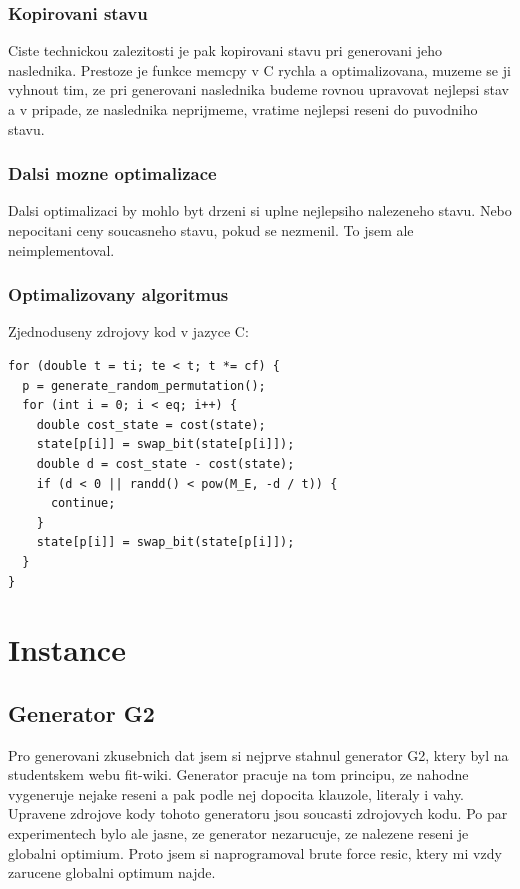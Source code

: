 \documentclass[12pt,a4paper]{article}
\begin{document}
\subsubsection{Kopirovani stavu}

Ciste technickou zalezitosti je pak kopirovani stavu pri generovani jeho naslednika. Prestoze je funkce memcpy v C rychla a optimalizovana, muzeme se ji vyhnout tim, ze pri generovani naslednika budeme rovnou upravovat nejlepsi stav a v pripade, ze naslednika neprijmeme, vratime nejlepsi reseni do puvodniho stavu.

\subsubsection{Dalsi mozne optimalizace}

Dalsi optimalizaci by mohlo byt drzeni si uplne nejlepsiho nalezeneho stavu. Nebo nepocitani ceny soucasneho stavu, pokud se nezmenil. To jsem ale neimplementoval.


\subsubsection{Optimalizovany algoritmus}

Zjednoduseny zdrojovy kod v jazyce C:

\begin{lstlisting}[frame=single]
for (double t = ti; te < t; t *= cf) {
  p = generate_random_permutation();
  for (int i = 0; i < eq; i++) {
    double cost_state = cost(state);
    state[p[i]] = swap_bit(state[p[i]]);
    double d = cost_state - cost(state);
    if (d < 0 || randd() < pow(M_E, -d / t)) {
      continue;
    }
    state[p[i]] = swap_bit(state[p[i]]);
  }
}
\end{lstlisting}



\section{Instance}

\subsection{Generator G2}

Pro generovani zkusebnich dat jsem si nejprve stahnul generator G2, ktery byl na studentskem webu fit-wiki. Generator pracuje na tom principu, ze nahodne vygeneruje nejake reseni a pak podle nej dopocita klauzole, literaly i vahy. Upravene zdrojove kody tohoto generatoru jsou soucasti zdrojovych kodu. Po par experimentech bylo ale jasne, ze generator nezarucuje, ze nalezene reseni je globalni optimium. Proto jsem si naprogramoval brute force resic, ktery mi vzdy zarucene globalni optimum najde. 
\end{document}

